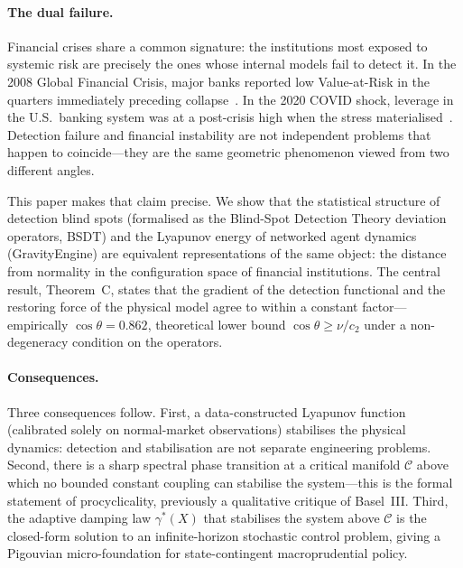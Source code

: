 \documentclass[11pt]{article}
\theoremstyle{definition}
\newcommand{\Cman}{\mathcal{C}}
\newcommand{\costheta}{\cos\theta}
\begin{document}
\paragraph{The dual failure.}
Financial crises share a common signature: the institutions most exposed to systemic
risk are precisely the ones whose internal models fail to detect it.  In the 2008
Global Financial Crisis, major banks reported low Value-at-Risk in the quarters
immediately preceding collapse~\citep{brunnermeier2009deciphering}.  In the 2020
COVID shock, leverage in the U.S.\ banking system was at a post-crisis high
when the stress materialised~\citep{greenwald2020financial}.  Detection failure
and financial instability are not independent problems that happen to coincide---they
are the same geometric phenomenon viewed from two different angles.

This paper makes that claim precise.  We show that the statistical structure of
detection blind spots (formalised as the Blind-Spot Detection Theory deviation
operators, BSDT) and the Lyapunov energy of networked agent dynamics (GravityEngine)
are equivalent representations of the same object: the distance from normality in
the configuration space of financial institutions.  The central result,
Theorem~C, states that the gradient of the detection functional and the restoring
force of the physical model agree to within a constant factor---empirically
$\costheta = 0.862$, theoretical lower bound $\costheta \ge \nu/c_2$ under a
non-degeneracy condition on the operators.

\paragraph{Consequences.}
Three consequences follow.  First, a data-constructed Lyapunov function (calibrated
solely on normal-market observations) stabilises the physical dynamics: detection
and stabilisation are not separate engineering problems.  Second, there is a sharp
spectral phase transition at a critical manifold $\Cman$ above which no bounded
constant coupling can stabilise the system---this is the formal statement of
procyclicality, previously a qualitative critique of Basel~III.  Third, the adaptive
damping law $\gamma^*(X)$ that stabilises the system above $\Cman$ is the
closed-form solution to an infinite-horizon stochastic control problem, giving a
Pigouvian micro-foundation for state-contingent macroprudential policy.
\end{document}
